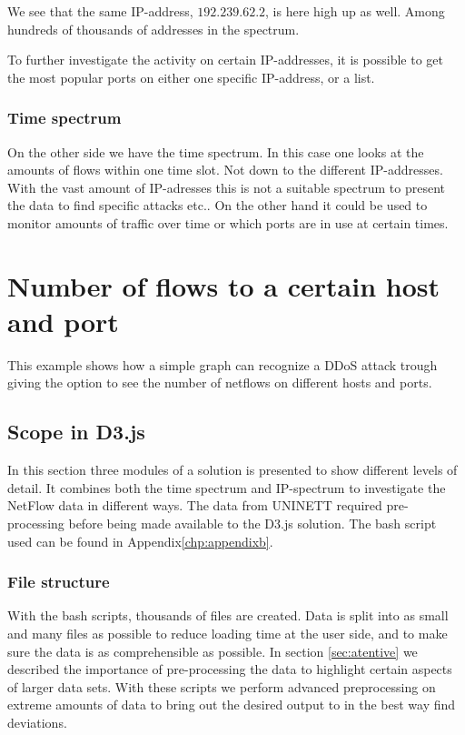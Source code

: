 We see that the same IP-address, $192.239.62.2$, is here high up as well. Among hundreds of thousands of addresses in the spectrum. 

To further investigate the activity on certain IP-addresses, it is possible to get the most popular ports on either one specific IP-address, or a list. 

\subsubsection{Time spectrum}
On the other side we have the time spectrum. In this case one looks at the amounts of flows within one time slot. Not down to the different IP-addresses. With the vast amount of IP-adresses this is not a suitable spectrum to present the data to find specific attacks etc.. On the other hand it could be used to monitor amounts of traffic over time or which ports are in use at certain times. 

\section{Number of flows to a certain host and port}
\label{sec:d3example}
This example shows how a simple graph can recognize a DDoS attack trough giving the option to see the number of netflows on different hosts and ports. 

\subsection{Scope in D3.js}
In this section three modules of a solution is presented to show different levels of detail. It combines both the time spectrum and IP-spectrum to investigate the NetFlow data in different ways. The data from UNINETT required pre-processing before being made available to the D3.js solution. The bash script used can be found in Appendix\ref{chp:appendixb}.

\subsubsection{File structure}
With the bash scripts, thousands of files are created. Data is split into as small and many files as possible to reduce loading time at the user side, and to make sure the data is as comprehensible as possible. In section \ref{sec:atentive} we described the importance of pre-processing the data to highlight certain aspects of larger data sets. With these scripts we perform advanced preprocessing on extreme amounts of data to bring out the desired output to in the best way find deviations.

